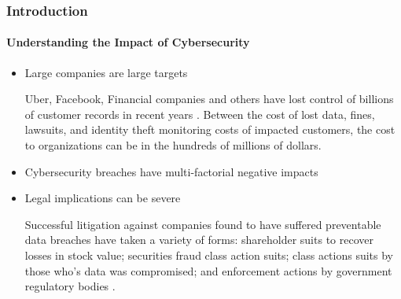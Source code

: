 \begin{frame}
  \frametitle{Introduction}
  \framesubtitle{Understanding the Impact of Cybersecurity}
  \begin{itemize}
    \item<1-> Large companies are large targets

           {\scriptsize{Uber, Facebook, Financial companies and others have lost control of billions of customer records in recent years \parencite{zadehCharacterizingCybersecurityThreats2020}. Between the cost of lost data, fines, lawsuits, and identity theft monitoring costs of impacted customers, the cost to organizations can be in the hundreds of millions of dollars. }}

    \item<2-> Cybersecurity breaches have multi-factorial negative impacts


    \item<3-> Legal implications can be severe

           {\scriptsize{Successful litigation against companies found to have suffered preventable data breaches have taken a variety of forms: shareholder suits to recover losses in stock value; securities fraud class action suits; class actions suits by those who's data was compromised; and enforcement actions by government regulatory bodies \parencite{hookerYouVeBeen2016}.}}


  \end{itemize}
\end{frame}
